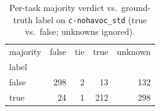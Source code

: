 \begin{table}[t]
  \centering
  \caption{Per-task majority verdict vs.\ ground-truth label on \texttt{c-nohavoc_std} (true vs.\ false; unknowns ignored).}
  \label{tab:majority-c-nohavoc_std}
\begin{tabular}{lrrrr}
\toprule
majority & false & tie & true & unknown \\
label &  &  &  &  \\
\midrule
false & 298 & 2 & 13 & 132 \\
true & 24 & 1 & 212 & 298 \\
\bottomrule
\end{tabular}
\end{table}

